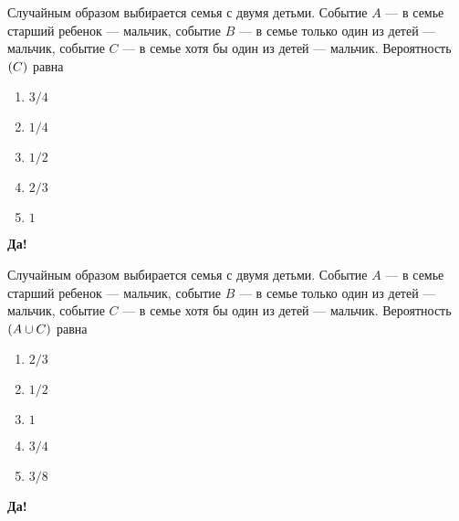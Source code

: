 \documentclass[t]{beamer}
\let\P\relax
\DeclareMathOperator{\P}{\mathbb{P}}
\begin{document}
 \begin{frame} \label{1-Yes} 
\begin{block}{1} 

Случайным образом выбирается семья с двумя детьми. Событие $A$ — в семье старший ребенок — мальчик,  событие $B$ — в семье только один из детей — мальчик, событие $C$ — в семье хотя бы один из детей — мальчик.  Вероятность $\P(C)$ равна
 


 \end{block} 
\begin{enumerate} 
\item[] \hyperlink{1-Yes}{\beamergotobutton{} $3/4$}
\item[] \hyperlink{1-No}{\beamergotobutton{} $1/4$}
\item[] \hyperlink{1-No}{\beamergotobutton{} $1/2$}
\item[] \hyperlink{1-No}{\beamergotobutton{} $2/3$
}
\item[] \hyperlink{1-No}{\beamergotobutton{} $1$}
\end{enumerate} 

 \textbf{Да!} 
 \hyperlink{2}{}\end{frame} 


 \begin{frame} \label{2-Yes} 
\begin{block}{2} 

Случайным образом выбирается семья с двумя детьми. Событие $A$ — в семье старший ребенок — мальчик,  событие $B$ — в семье только один из детей — мальчик, событие $C$ — в семье хотя бы один из детей — мальчик.  Вероятность $\P(A \cup C)$ равна
    


 \end{block} 
\begin{enumerate} 
\item[] \hyperlink{2-No}{\beamergotobutton{} $2/3$}
\item[] \hyperlink{2-No}{\beamergotobutton{} $1/2$
}
\item[] \hyperlink{2-No}{\beamergotobutton{} $1$}
\item[] \hyperlink{2-Yes}{\beamergotobutton{} $3/4$}
\item[] \hyperlink{2-No}{\beamergotobutton{} $3/8$}
\end{enumerate} 

 \textbf{Да!} 
 \hyperlink{3}{}\end{frame} 
\end{document}
